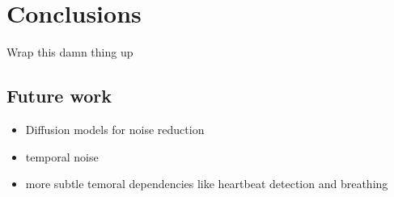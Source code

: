 \chapter{Conclusions}
\label{ch:conclusions}

Wrap this damn thing up

\section{Future work}

\begin{itemize}
    \item Diffusion models for noise reduction
    \item temporal noise
    \item more subtle temoral dependencies like heartbeat detection and breathing
\end{itemize}